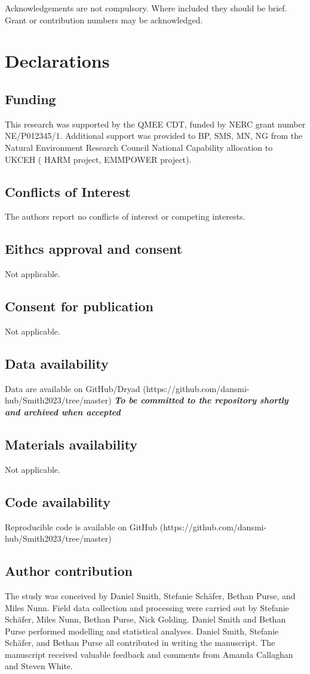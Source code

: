 \documentclass[lineno,sn-basic]{sn-jnl}%
\begin{document}
Acknowledgements are not compulsory. Where included they should be brief. Grant or contribution numbers may be acknowledged.

\section*{Declarations}

\subsection{Funding}
This research was supported by the QMEE CDT, funded by NERC grant number NE/P012345/1. Additional support was provided to BP, SMS, MN, NG from the Natural Environment Research Council National Capability allocation to UKCEH ( HARM project, EMMPOWER project).
\subsection{Conflicts of Interest}
The authors report no conflicts of interest or competing interests.
\subsection{Eithcs approval and consent}
Not applicable.
\subsection{Consent for publication}
Not applicable.
\subsection{Data availability}
Data are available on GitHub/Dryad (https://github.com/dansmi-hub/Smith2023/tree/master) \textbf{\textit{To be committed to the repository shortly and archived when accepted}}
\subsection{Materials availability}
Not applicable.
\subsection{Code availability}
Reproducible code is available on GitHub (https://github.com/dansmi-hub/Smith2023/tree/master)
\subsection{Author contribution}
The study was conceived by Daniel Smith, Stefanie Schäfer, Bethan Purse, and Miles Nunn. Field data collection and processing were carried out by Stefanie Schäfer, Miles Nunn, Bethan Purse, Nick Golding. Daniel Smith and Bethan Purse performed modelling and statistical analyses. Daniel Smith, Stefanie Schäfer, and Bethan Purse all contributed in writing the manuscript. The manuscript received valuable feedback and comments from Amanda Callaghan and Steven White.
\end{document}
